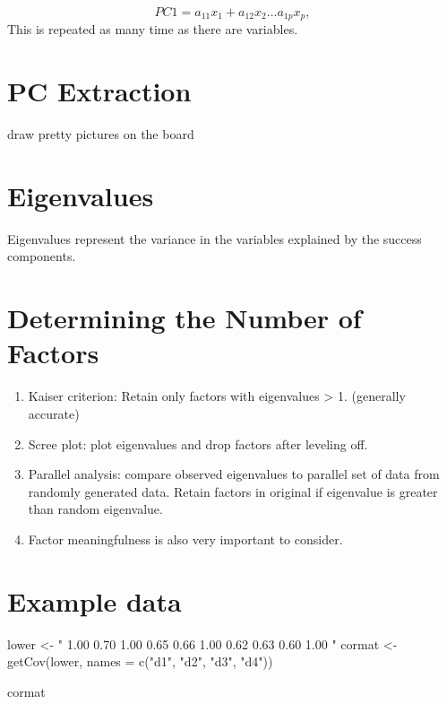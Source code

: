 \documentclass[
]{book}
\newenvironment{Shaded}{\begin{snugshade}}{\end{snugshade}}
\newcommand{\AttributeTok}[1]{\textcolor[rgb]{0.77,0.63,0.00}{#1}}
\newcommand{\FunctionTok}[1]{\textcolor[rgb]{0.00,0.00,0.00}{#1}}
\newcommand{\NormalTok}[1]{#1}
\newcommand{\OtherTok}[1]{\textcolor[rgb]{0.56,0.35,0.01}{#1}}
\newcommand{\StringTok}[1]{\textcolor[rgb]{0.31,0.60,0.02}{#1}}
\providecommand{\tightlist}{%
  \setlength{\itemsep}{0pt}\setlength{\parskip}{0pt}}
\begin{document}
\[
PC1 = a_{11}x_1 + a_{12}x_2 ... a_{1p}x_p, 
\]
This is repeated as many time as there are variables.

\hypertarget{pc-extraction}{%
\section{PC Extraction}\label{pc-extraction}}

draw pretty pictures on the board

\hypertarget{eigenvalues}{%
\section{Eigenvalues}\label{eigenvalues}}

Eigenvalues represent the variance in the variables explained by the success components.

\hypertarget{determining-the-number-of-factors}{%
\section{Determining the Number of Factors}\label{determining-the-number-of-factors}}

\begin{enumerate}
\def\labelenumi{\arabic{enumi}.}
\tightlist
\item
  Kaiser criterion: Retain only factors with eigenvalues \textgreater{} 1. (generally accurate)
\item
  Scree plot: plot eigenvalues and drop factors after leveling off.
\item
  Parallel analysis: compare observed eigenvalues to parallel set of data from randomly generated data. Retain factors in original if eigenvalue is greater than random eigenvalue.
\item
  Factor meaningfulness is also very important to consider.
\end{enumerate}

\hypertarget{example-data}{%
\section{Example data}\label{example-data}}

\begin{Shaded}
\begin{Highlighting}[]
\NormalTok{lower }\OtherTok{\textless{}{-}} \StringTok{"}
\StringTok{1.00}
\StringTok{0.70 1.00}
\StringTok{0.65 0.66 1.00}
\StringTok{0.62 0.63 0.60 1.00}
\StringTok{"}
\NormalTok{cormat }\OtherTok{\textless{}{-}} \FunctionTok{getCov}\NormalTok{(lower, }\AttributeTok{names =} \FunctionTok{c}\NormalTok{(}\StringTok{"d1"}\NormalTok{, }\StringTok{"d2"}\NormalTok{, }\StringTok{"d3"}\NormalTok{, }\StringTok{"d4"}\NormalTok{))}

\NormalTok{cormat}
\end{Highlighting}
\end{Shaded}
\end{document}

